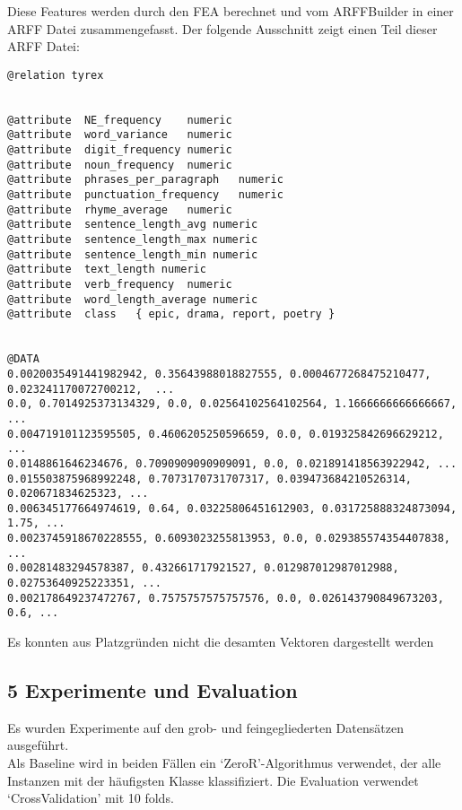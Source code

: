 \documentclass[]{article}
\begin{document}
Diese Features werden durch den FEA berechnet und vom ARFFBuilder in
einer ARFF Datei zusammengefasst. Der folgende Ausschnitt zeigt einen
Teil dieser ARFF Datei:

\vspace{4 mm}\begin{verbatim}
@relation tyrex


@attribute  NE_frequency    numeric
@attribute  word_variance   numeric
@attribute  digit_frequency numeric
@attribute  noun_frequency  numeric
@attribute  phrases_per_paragraph   numeric
@attribute  punctuation_frequency   numeric
@attribute  rhyme_average   numeric
@attribute  sentence_length_avg numeric
@attribute  sentence_length_max numeric
@attribute  sentence_length_min numeric
@attribute  text_length numeric
@attribute  verb_frequency  numeric
@attribute  word_length_average numeric
@attribute  class   { epic, drama, report, poetry }


@DATA
0.0020035491441982942, 0.35643988018827555, 0.0004677268475210477, 0.023241170072700212,  ...
0.0, 0.7014925373134329, 0.0, 0.02564102564102564, 1.1666666666666667, ...
0.004719101123595505, 0.4606205250596659, 0.0, 0.019325842696629212, ...
0.0148861646234676, 0.7090909090909091, 0.0, 0.021891418563922942, ...
0.015503875968992248, 0.7073170731707317, 0.039473684210526314, 0.020671834625323, ...
0.006345177664974619, 0.64, 0.03225806451612903, 0.031725888324873094, 1.75, ...
0.0023745918670228555, 0.6093023255813953, 0.0, 0.029385574354407838, ...
0.00281483294578387, 0.432661717921527, 0.012987012987012988, 0.02753640925223351, ...
0.002178649237472767, 0.7575757575757576, 0.0, 0.026143790849673203, 0.6, ...
\end{verbatim}
\begin{tiny}Es konnten aus Platzgründen nicht die desamten Vektoren dargestellt werden\end{tiny}
\vspace{4 mm}

\subsection{5 Experimente und
Evaluation}\label{experimente-und-evaluation}

Es wurden Experimente auf den grob- und feingegliederten Datensätzen
ausgeführt.\\
Als Baseline wird in beiden Fällen ein `ZeroR'-Algorithmus verwendet,
der alle Instanzen mit der häufigsten Klasse klassifiziert. Die
Evaluation verwendet `CrossValidation' mit 10 folds.
\end{document}
